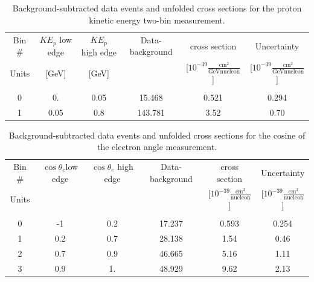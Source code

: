 \documentclass[amsmath,amssymb,aps,prd,showpacs,twocolumn,superscriptaddress,letterpaper,longbibliography, floatfix]{revtex4-2}
\begin{document}
\begin{table}[H]
\caption{Background-subtracted data events and unfolded cross sections for the proton kinetic energy two-bin measurement.}
\label{tbl:ResPe2}
\begin{center} \begin{tabular}{|c|c|c|c|c|c|}
\hline
Bin \# & $KE_{p}$ low edge & $KE_{p}$ high edge  & Data-background&  cross section  & Uncertainty\\
Units& [GeV]&[GeV]&&[$10^{-39}\frac{\mathrm{cm^2}}{\mathrm{GeV nucleon}}$]&[$10^{-39}\frac{\mathrm{cm^2}}{\mathrm{GeV nucleon}}$]\\
&&&&&\\
0&0.&0.05& 15.468&0.521&0.294\\
1&0.05&0.8&143.781&3.52&0.70\\
\hline
\end{tabular} \end{center}
\end{table}

\begin{table}[H]
\caption{Background-subtracted data events and unfolded cross sections for the cosine of the electron angle measurement.}
\label{tbl:ResEA}
\begin{center} 
\begin{tabular}{|c|c|c|c|c|c|}
\hline
Bin \# & $\cos\theta_e$low edge & $\cos\theta_e$ high edge  & Data-background&  cross section  & Uncertainty   \\
Units& &&&[$10^{-39}\frac{\mathrm{cm^2}}{\mathrm{nucleon}}$]&[$10^{-39}\frac{\mathrm{cm^2}}{\mathrm{nucleon}}$]\\
&&&&&\\
0&-1&0.2& 17.237&0.593&0.254\\
1&0.2&0.7&28.138&1.54&0.46\\
2&0.7&0.9&46.665&5.16&1.11\\
3&0.9&1.&48.929&9.62&2.13\\
\hline
\end{tabular} \end{center}
\end{table}\FloatBarrier
\end{document}
